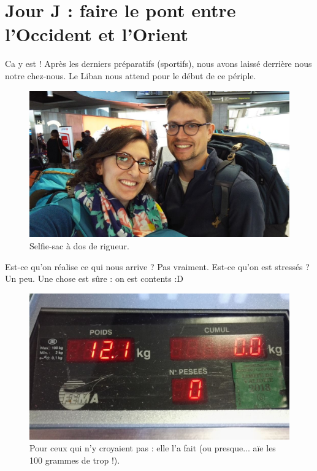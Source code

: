 \hypertarget{jour-j-faire-le-pont-entre-loccident-et-lorient}{%
\section{Jour J : faire le pont entre l'Occident et
l'Orient}\label{jour-j-faire-le-pont-entre-loccident-et-lorient}}

Ca y est ! Après les derniers préparatifs (sportifs), nous avons laissé
derrière nous notre chez-nous. Le Liban nous attend pour le début de ce
périple.

\begin{figure}
\centering
\includegraphics{images/20180503_depart.jpg}
\caption{Selfie-sac à dos de rigueur.}
\end{figure}

Est-ce qu'on réalise ce qui nous arrive ? Pas vraiment. Est-ce qu'on est
stressés ? Un peu. Une chose est sûre : on est contents :D

\begin{figure}
\centering
\includegraphics{images/20180503_Elida_sac.jpg}
\caption{Pour ceux qui n'y croyaient pas : elle l'a fait (ou presque...
aïe les 100 grammes de trop !).}
\end{figure}

